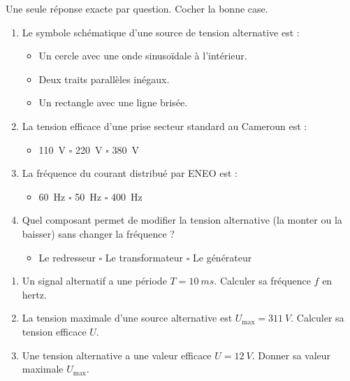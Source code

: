 \documentclass[11pt]{article}
\begin{document}
\begin{exercice}
Une seule réponse exacte par question. Cocher la bonne case.
\begin{enumerate}
    \item Le symbole schématique d'une source de tension alternative est :
    \begin{itemize}
        \item[$\square$] Un cercle avec une onde sinusoïdale à l'intérieur.
        \item[$\square$] Deux traits parallèles inégaux.
        \item[$\square$] Un rectangle avec une ligne brisée.
    \end{itemize}
    \item La tension efficace d'une prise secteur standard au Cameroun est :
    \begin{itemize}
        \item[$\square$] \SI{110}{V} \quad $\square$ \SI{220}{V} \quad $\square$ \SI{380}{V}
    \end{itemize}
    \item La fréquence du courant distribué par ENEO est :
    \begin{itemize}
        \item[$\square$] \SI{60}{Hz} \quad $\square$ \SI{50}{Hz} \quad $\square$ \SI{400}{Hz}
    \end{itemize}
    \item Quel composant permet de modifier la tension alternative (la monter ou la baisser) sans changer la fréquence ?
    \begin{itemize}
        \item[$\square$] Le redresseur \quad $\square$ Le transformateur \quad $\square$ Le générateur
    \end{itemize}
\end{enumerate}
\end{exercice}

\begin{exercice}
\begin{enumerate}
    \item Un signal alternatif a une période $T = \SI{10}{ms}$. Calculer sa fréquence $f$ en hertz.
    \item La tension maximale d'une source alternative est $U_{\text{max}} = \SI{311}{V}$. Calculer sa tension efficace $U$.
    \item Une tension alternative a une valeur efficace $U = \SI{12}{V}$. Donner sa valeur maximale $U_{\text{max}}$.
\end{enumerate}
\end{exercice}
\end{document}
